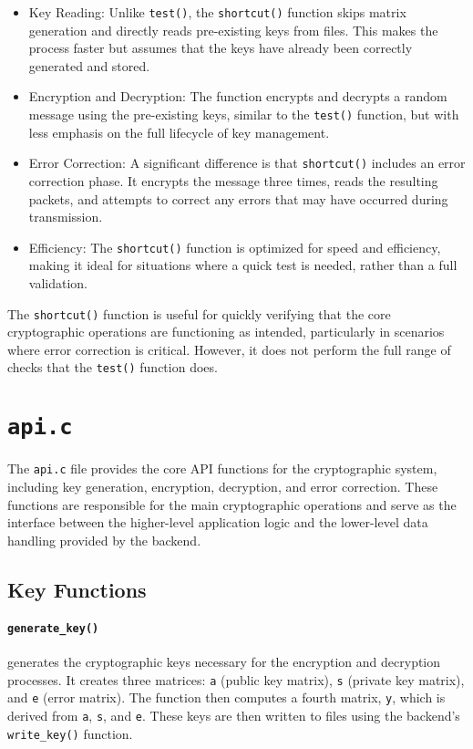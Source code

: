 \begin{itemize}
    \item Key Reading: Unlike \texttt{test()}, the \texttt{shortcut()} function skips matrix generation and directly reads pre-existing keys from files. This makes the process faster but assumes that the keys have already been correctly generated and stored.
    \item Encryption and Decryption: The function encrypts and decrypts a random message using the pre-existing keys, similar to the \texttt{test()} function, but with less emphasis on the full lifecycle of key management.
    \item Error Correction: A significant difference is that \texttt{shortcut()} includes an error correction phase. It encrypts the message three times, reads the resulting packets, and attempts to correct any errors that may have occurred during transmission.
    \item Efficiency: The \texttt{shortcut()} function is optimized for speed and efficiency, making it ideal for situations where a quick test is needed, rather than a full validation.
\end{itemize}

The \texttt{shortcut()} function is useful for quickly verifying that the core cryptographic operations are functioning as intended, particularly in scenarios where error correction is critical. However, it does not perform the full range of checks that the \texttt{test()} function does.

\section{\texttt{api.c}}

The \texttt{api.c} file provides the core API functions for the cryptographic system, including key generation, encryption, decryption, and error correction. These functions are responsible for the main cryptographic operations and serve as the interface between the higher-level application logic and the lower-level data handling provided by the backend.

\subsection{Key Functions}

\paragraph{\texttt{generate\_key()}}
generates the cryptographic keys necessary for the encryption and decryption processes. It creates three matrices: \texttt{a} (public key matrix), \texttt{s} (private key matrix), and \texttt{e} (error matrix). The function then computes a fourth matrix, \texttt{y}, which is derived from \texttt{a}, \texttt{s}, and \texttt{e}. These keys are then written to files using the backend's \texttt{write\_key()} function.

